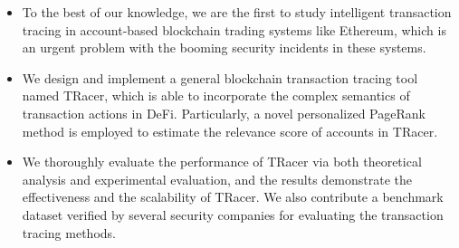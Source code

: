 \begin{itemize}
    \item To the best of our knowledge, we are the first to study intelligent transaction tracing in account-based blockchain trading systems like Ethereum, which is an urgent problem with the booming security incidents in these systems.
    \item We design and implement a general blockchain transaction tracing tool named TRacer, which is able to incorporate the complex semantics of transaction actions in DeFi. Particularly, a novel personalized PageRank method is employed to estimate the relevance score of accounts in TRacer.
    \item We thoroughly evaluate the performance of TRacer via both theoretical analysis and experimental evaluation, and the results demonstrate the effectiveness and the scalability of TRacer. We also contribute a benchmark dataset verified by several security companies for evaluating the transaction tracing methods.
\end{itemize}

